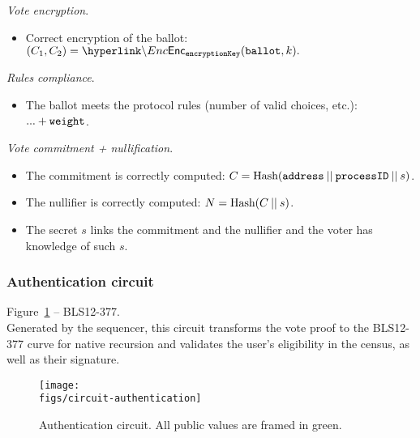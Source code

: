 \begin{mdframed}
\begin{minipage}[H]{1\textwidth}
\begin{spacing}{1.25}
				\emph{Vote encryption}. 
				\begin{itemize}								
					\item Correct encryption of the ballot: $(C_1, C_2) = \hlget{\Enc}_{\epk}(\ballot, k).$
				\end{itemize}
				\emph{Rules compliance}. 
				\begin{itemize}								
					\item The ballot meets the protocol rules (number of valid choices, etc.): $... + \texttt{weight}$.
				\end{itemize}
				\emph{Vote commitment + nullification}. 
				\begin{itemize}								
					\item The commitment is correctly computed: $C = \text{Hash} (\texttt{address} \:||\: \texttt{processID} \:||\: s)$.
					\item The nullifier is correctly computed: $N = \text{Hash}(C \:||\: s)$.
					\item The secret $s$ links the commitment and the nullifier and the voter has knowledge of such $s$.
				\end{itemize}
				\vspace{-0.3cm}
		\end{spacing}
	\end{minipage}
\end{mdframed}

\newpage
\subsubsection{Authentication circuit}
\label{sec:vocdoni-protocol:circuits:authentication}

Figure~\ref{fig:circuit-authentication} -- BLS12-377.\\

\noi Generated by the sequencer, this circuit transforms the vote proof to the BLS12-377 curve for native recursion and validates the user's eligibility in the census, as well as their signature.


\begin{figure}[H]
	\centerline{\texttt{[image: \\figs/circuit-authentication]}}
	\caption{Authentication circuit. All public values are framed in green.}
	\label{fig:circuit-authentication}
\end{figure}

